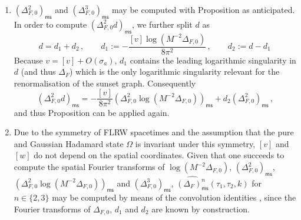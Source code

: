 \documentclass[10pt]{book}
\newcommand{\ms}{\mathsf{ms}}
\theoremstyle{break}
\begin{document}
\begin{enumerate}
\item $\left(\Delta^2_{F,0}\right)_\ms$ and  $\left(\Delta^3_{F,0}\right)_\ms$ may be computed with Proposition %
as anticipated. In order to compute $\left(\Delta^2_{F,0} d\right)_\ms$, we further split $d$ as
\begin{equation*}%
d=d_1+d_2\,,\qquad d_1:= -\frac{[v] \log \left(M^{-2} \Delta_{F,0}\right)}{8\pi^2}\,,\qquad d_2:=d-d_1\, \end{equation*}
Because $v=[v]+O(\sigma_a)$, $d_1$ contains the leading logarithmic singularity in $d$ (and thus $\Delta_F$) which is the only logarithmic singularity relevant for the renormalisation of the sunset graph. Consequently
%
\begin{equation*}%
\left(\Delta^2_{F,0} d\right)_\ms=- \frac{[v]}{8\pi^2}\left(\Delta^2_{F,0}\log \left(M^{-2} \Delta_{F,0}\right)\right)_\ms + d_2 \left(\Delta^2_{F,0}\right)_\ms\,,\end{equation*}
%
and thus Proposition %
can be applied again.
\item Due to the symmetry of FLRW spacetimes and the assumption that the pure and Gaussian Hadamard state $\Omega$ is invariant under this symmetry, $[v]$ and $[w]$ do not depend on the spatial coordinates. Given that one succeeds to compute the spatial Fourier transforms of $\log \left(M^{-2} \Delta_{F,0}\right)$, $\left(\Delta^2_{F,0}\right)_\ms$, $\left(\Delta^2_{F,0}\log \left(M^{-2} \Delta_{F,0}\right)\right)_\ms$ and  $\left(\Delta^3_{F,0}\right)_\ms$, $\widehat{(\Delta_{F})^n_\ms}(\tau_1,\tau_2,k)$ for $n\in\{2,3\}$ may be computed by means of the convolution identities %
, since the Fourier transforms of $\Delta_{F,0}$, $d_1$ and $d_2$ are known by construction.
\end{enumerate}
\end{document}
